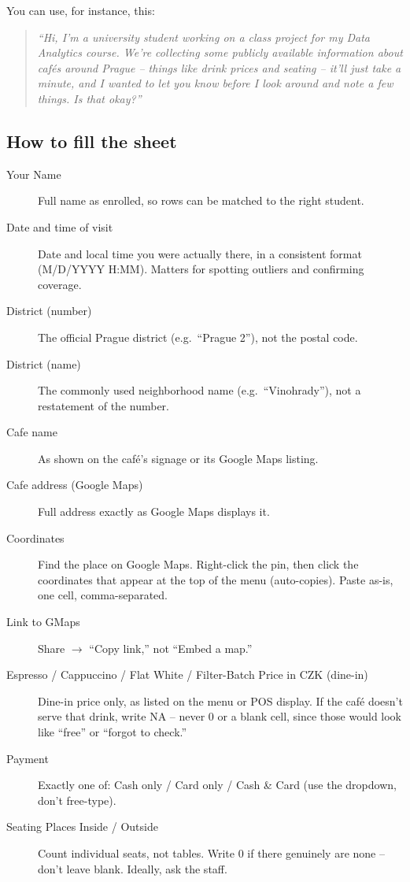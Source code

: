 \documentclass[11pt,a4paper]{article}
\begin{document}
You can use, for instance, this:
\begin{quote}
\itshape ``Hi, I'm a university student working on a class project for my Data Analytics course. We're collecting some publicly available information about caf\'es around Prague -- things like drink prices and seating -- it'll just take a minute, and I wanted to let you know before I look around and note a few things. Is that okay?''
\end{quote}

\subsection*{How to fill the sheet}

\begin{description}
\item[Your Name] Full name as enrolled, so rows can be matched to the right student.
\item[Date and time of visit] Date and local time you were actually there, in a consistent format (M/D/YYYY H:MM). Matters for spotting outliers and confirming coverage.
\item[District (number)] The official Prague district (e.g.\ ``Prague 2''), not the postal code.
\item[District (name)] The commonly used neighborhood name (e.g.\ ``Vinohrady''), not a restatement of the number.
\item[Cafe name] As shown on the caf\'e's signage or its Google Maps listing.
\item[Cafe address (Google Maps)] Full address exactly as Google Maps displays it.
\item[Coordinates] Find the place on Google Maps. Right-click the pin, then click the coordinates that appear at the top of the menu (auto-copies). Paste as-is, one cell, comma-separated.
\item[Link to GMaps] Share $\rightarrow$ ``Copy link,'' not ``Embed a map.''
\item[Espresso / Cappuccino / Flat White / Filter-Batch Price in CZK (dine-in)] Dine-in price only, as listed on the menu or POS display. If the caf\'e doesn't serve that drink, write NA -- never 0 or a blank cell, since those would look like ``free'' or ``forgot to check.''
\item[Payment] Exactly one of: Cash only / Card only / Cash \& Card (use the dropdown, don't free-type).
\item[Seating Places Inside / Outside] Count individual seats, not tables. Write 0 if there genuinely are none -- don't leave blank. Ideally, ask the staff.

\end{description}
\end{document}
